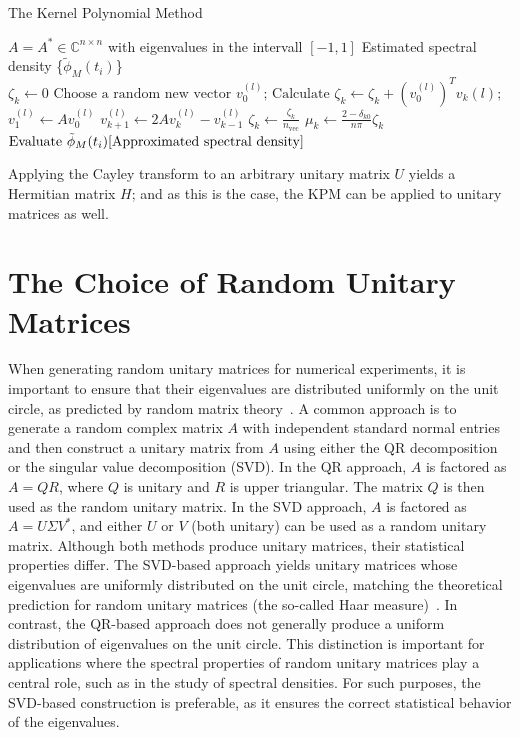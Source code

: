 \begin{algorithm}
    \caption{The Kernel Polynomial Method}\label{alg:cap}
    \begin{algorithmic}[5]
    \Require $A = A^* \in \mathbb{C}^{n \times n}$ with eigenvalues in the intervall $[-1, 1]$
    \Ensure Estimated spectral density \{$\tilde{\phi}_M(t_i)$\}\\
    \State $\zeta_k \gets 0$
    \EndFor
    \State $\text{Choose a random new vector } v_0^{(l)}\text{;}$ 
    \State $\text{Calculate } \zeta_k \gets \zeta_k + \left( v_0^{(l)} \right)^T v_k{(l)}\text{;}$  
    \State $v_1^{(l)} \gets A v_0^{(l)}$
    \Else
    \State $v_{k+1}^{(l)} \gets 2 A v_k^{(l)} - v_{k-1}^{(l)}$ 
    \EndIf
    \EndFor
    \EndFor
    \State $\zeta_k \gets \frac{\zeta_k}{n_{\text{vec}}}$
    \State $\mu_k \gets \frac{2 - \delta_{k0}}{n \pi} \zeta_k$
    \EndFor
    \State $\text{Evaluate } \tilde{\phi}_M(t_i) \eqref{Approximated spectral density}$
    \end{algorithmic}
\end{algorithm}

Applying the Cayley transform to an arbitrary unitary matrix $U$ yields a Hermitian matrix $H$;
and as this is the case, the KPM can be applied to unitary matrices as well.

\section{The Choice of Random Unitary Matrices}

When generating random unitary matrices for numerical experiments,
it is important to ensure that their eigenvalues are distributed uniformly on the unit circle,
as predicted by random matrix theory~\cite{mezzadri2007}.
A common approach is to generate a random complex matrix $A$ with independent standard normal entries
and then construct a unitary matrix from $A$ using either the QR decomposition or the singular value decomposition (SVD).
In the QR approach, $A$ is factored as $A = QR$, where $Q$ is unitary and $R$ is upper triangular.
The matrix $Q$ is then used as the random unitary matrix.
In the SVD approach, $A$ is factored as $A = U \Sigma V^*$,
and either $U$ or $V$ (both unitary) can be used as a random unitary matrix.
Although both methods produce unitary matrices, their statistical properties differ.
The SVD-based approach yields unitary matrices whose eigenvalues are uniformly distributed on the unit circle,
matching the theoretical prediction for random unitary matrices (the so-called Haar measure)~\cite{mezzadri2007}.
In contrast, the QR-based approach does not generally produce a uniform distribution of eigenvalues on the unit circle.
This distinction is important for applications where the spectral properties of random unitary matrices play a central role,
such as in the study of spectral densities.
For such purposes, the SVD-based construction is preferable,
as it ensures the correct statistical behavior of the eigenvalues.

